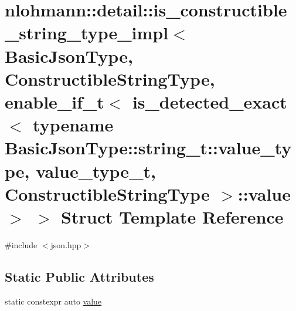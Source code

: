 \hypertarget{structnlohmann_1_1detail_1_1is__constructible__string__type__impl_3_01_basic_json_type_00_01_con83e8ebfe9593f851a60fdb8360df1512}{}\section{nlohmann\+::detail\+::is\+\_\+constructible\+\_\+string\+\_\+type\+\_\+impl$<$ Basic\+Json\+Type, Constructible\+String\+Type, enable\+\_\+if\+\_\+t$<$ is\+\_\+detected\+\_\+exact$<$ typename Basic\+Json\+Type\+::string\+\_\+t\+::value\+\_\+type, value\+\_\+type\+\_\+t, Constructible\+String\+Type $>$\+::value $>$ $>$ Struct Template Reference}
\label{structnlohmann_1_1detail_1_1is__constructible__string__type__impl_3_01_basic_json_type_00_01_con83e8ebfe9593f851a60fdb8360df1512}


{\ttfamily \#include $<$json.\+hpp$>$}

\subsection*{Static Public Attributes}
\begin{DoxyCompactItemize}
\item 
static constexpr auto \mbox{\hyperlink{structnlohmann_1_1detail_1_1is__constructible__string__type__impl_3_01_basic_json_type_00_01_con83e8ebfe9593f851a60fdb8360df1512_a3aeae0de0fc37bd5acf3c9d39b132678}{value}}
\end{DoxyCompactItemize}


